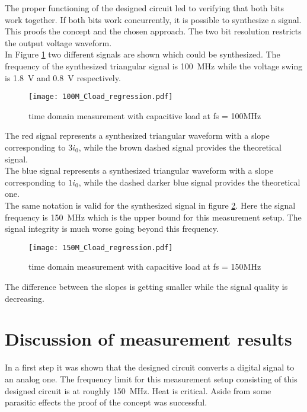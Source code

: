 The proper functioning of the designed circuit led to verifying that both bits work together.
If both bits work concurrently, it is possible to synthesize a signal.
This proofs the concept and the chosen approach.
The two bit resolution restricts the output voltage waveform.\\
In Figure \ref{fig:measCload100M} two different signals are shown which could be synthesized. 
The frequency of the synthesized triangular signal is \SI{100}{\mega \hertz} while the voltage swing is \SI{1.8}{\volt} and \SI{0.8}{\volt} respectively.

\begin{figure}[htb!]
	\centering
  \texttt{[image: 100M\_Cload\_regression.pdf]}
	\caption{time domain measurement with capacitive load at fs = 100MHz}
	\label{fig:measCload100M}
\end{figure}

The red signal represents a synthesized triangular waveform with a slope corresponding to $3 i_0$, while the brown dashed signal provides the theoretical signal.\\
The blue signal represents a synthesized triangular waveform with a slope corresponding to $1 i_0$, while the dashed darker blue signal provides the theoretical one.\\
The same notation is valid for the synthesized signal in figure \ref{fig:measCload150M}.
Here the signal frequency is \SI{150}{\mega \hertz} which is the upper bound for this measurement setup.
The signal integrity is much worse going beyond this frequency.

\begin{figure}[htb!]
	\centering
  \texttt{[image: 150M\_Cload\_regression.pdf]}
	\caption{time domain measurement with capacitive load at fs = 150MHz}
	\label{fig:measCload150M}
\end{figure}


The difference between the slopes is getting smaller while the signal quality is decreasing.


\section{Discussion of measurement results}
In a first step it was shown that the designed circuit converts a digital signal to an analog one.
The frequency limit for this measurement setup consisting of this designed circuit is at roughly \SI{150}{\mega \hertz}.
Heat is critical. 
Aside from some parasitic effects the proof of the concept was successful.

